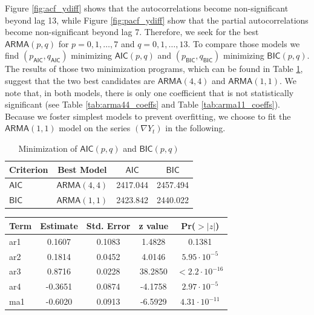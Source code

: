 \documentclass[12pt]{article}
\newcommand{\ARMA}{\textsf{ARMA}}
\newcommand{\AIC}{\textsf{AIC}}
\newcommand{\BIC}{\textsf{BIC}}
\begin{document}
\begin{enumerate}
        Figure \ref{fig:acf_ydiff} shows that the autocorrelations become non-significant beyond lag 13, while Figure \ref{fig:pacf_ydiff} show that the partial autocorrelations become non-significant beyond lag 7. Therefore, we seek for the best $\ARMA(p, q)$ for $p = 0, 1, \dots, 7$ and $q = 0, 1, \dots, 13$. To compare those models we find $(p_{\AIC}, q_{\AIC})$ minimizing $\AIC(p, q)$ and $(p_{\BIC}, q_{\BIC})$ minimizing $\BIC(p, q)$. The results of those two minimization programs, which can be found in Table \ref{tab:aic_bic_results}, suggest that the two best candidates are $\ARMA(4, 4)$ and $\ARMA(1, 1)$. We note that, in both models, there is only one coefficient that is not statistically significant (see Table \ref{tab:arma44_coeffs} and Table \ref{tab:arma11_coeffs}). Because we foster simplest models to prevent overfitting, we choose to fit the $\ARMA(1, 1)$ model on the series $(\nabla Y_t)$ in the following.
        \begin{table}[ht]
            \centering
            \begin{tabular}{l|ccc}
                \textbf{Criterion} & \textbf{Best Model} & $\AIC$ & $\BIC$ \\
                \hline
                $\AIC$  & $\ARMA(4, 4)$ & 2417.044 & 2457.494 \\
                $\BIC$  & $\ARMA(1, 1)$ & 2423.842 & 2440.022 
            \end{tabular}
            \caption{Minimization of $\AIC(p, q)$ and $\BIC(p, q)$}
            \label{tab:aic_bic_results}
        \end{table}
        \begin{table}[ht]
            \centering
            \begin{tabular}{l|cccc}
                \textbf{Term} & \textbf{Estimate} & \textbf{Std. Error} & \textbf{z value} & \textbf{Pr($>|z|$)} \\
                \hline
                \rowcolor{red!15} ar1          & 0.1607  & 0.1083 & 1.4828   & 0.1381 \\
                ar2                            & 0.1814  & 0.0452 & 4.0146   & $5.95 \cdot 10^{-5}$ \\
                ar3                            & 0.8716  & 0.0228 & 38.2850  & $< 2.2 \cdot 10^{-16}$ \\
                ar4                            & -0.3651 & 0.0874 & -4.1758  & $2.97 \cdot 10^{-5}$ \\
                ma1                            & -0.6020 & 0.0913 & -6.5929  & $4.31 \cdot 10^{-11}$ \\

\end{tabular}
\end{table}
\end{enumerate}
\end{document}
